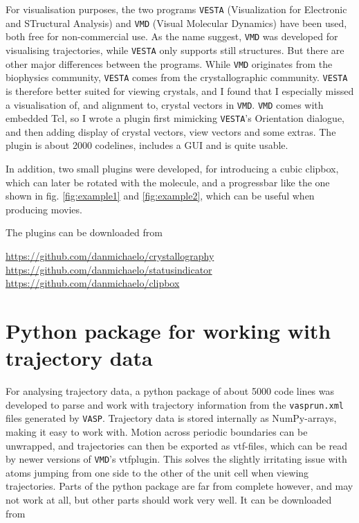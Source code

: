 \documentclass[11pt,bibliography=totoc,index=totoc]{scrbook}   %
\newcommand{\vasp}{{\texttt{VASP}}} %
\newcommand{\vesta}{{\texttt{VESTA}}} %
\newcommand{\vmd}{{\texttt{VMD}}} %
\begin{document}
For visualisation purposes, the two programs {\vesta} (Visualization for Electronic and STructural Analysis) and {\vmd} (Visual Molecular Dynamics) have been used, both free for non-commercial use.
As the name suggest, {\vmd} was developed for visualising trajectories, while {\vesta} only supports still structures.
But there are other major differences between the programs. While {\vmd} originates from the biophysics community, {\vesta} comes from the crystallographic community.
{\vesta} is therefore better suited for viewing crystals, and I found that I especially missed a visualisation of, and alignment to, crystal vectors in \vmd.
{\vmd} comes with embedded Tcl, so I wrote a plugin first mimicking {\vesta}'s Orientation dialogue, and then adding 
display of crystal vectors, view vectors and some extras.
The plugin is about 2000 codelines, includes a GUI and is quite usable.

In addition, two small plugins were developed, for introducing a cubic clipbox, which can later be rotated with the molecule,
and a progressbar like the one shown in fig. \ref{fig:example1} and \ref{fig:example2},
which can be useful when producing movies. 

The plugins can be downloaded from

\url{https://github.com/danmichaelo/crystallography} \\
\url{https://github.com/danmichaelo/statusindicator}\\
\url{https://github.com/danmichaelo/clipbox}


\section{Python package for working with trajectory data}

For analysing trajectory data, a python package of about 5000 code lines was developed to parse and work with trajectory information 
from the \texttt{vasprun.xml} files generated by {\vasp}. 
Trajectory data is stored internally as NumPy-arrays, making it easy to work with.
Motion across periodic boundaries can be unwrapped, and trajectories can then be exported as vtf-files, which can be read by newer versions of {\vmd}'s vtfplugin.
This solves the slightly irritating issue with atoms jumping from one side to the other of the unit cell when viewing trajectories.
Parts of the python package are far from complete however, and may not work at all, but other parts should work very well.
It can be downloaded from
\end{document}
